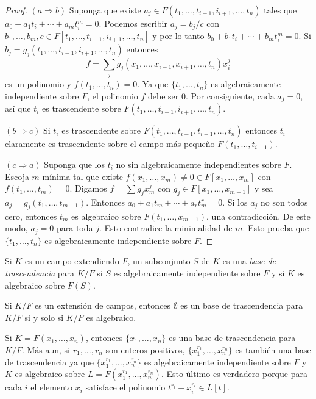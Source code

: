 \begin{proof}
  $(a \Rightarrow b)$ Suponga que existe $a_j\in F(t_1, \ldots, t_{i-1}, i_{i+1},\ldots, t_n)$ tales que $a_0 + a_1 t_i + \cdots + a_m t_i^{m} = 0$. Podemos escribir $a_j = b_j/c$ con $b_1, \ldots, b_m, c \in F[t_1, \ldots, t_{i-1}, i_{i+1},\ldots, t_n]$ y por lo tanto $b_0 + b_1 t_i + \cdots + b_m t_i^{m} = 0$. Si $b_j = g_j(t_1, \ldots, t_{i-1}, i_{i+1},\ldots, t_n)$ entonces
  \[
    f =  \sum_j g_j (x_1, \ldots, x_{i-1}, x_{i+1},\ldots, t_n) x_i^j 
  \]
  es un polinomio y $f(t_1,\ldots, t_n) =0$. Ya que $\{t_1, \ldots,t_n\}$ es algebraicamente independiente sobre $F$, el polinomio $f$ debe ser $0$. Por consiguiente, cada $a_j =0$, así que $t_i$ es trascendente sobre $F(t_1, \ldots, t_{i-1}, i_{i+1},\ldots, t_n)$.

  $(b \Rightarrow c)$ Si $t_i$ es trascendente sobre $F(t_1, \ldots, t_{i-1}, t_{i+1}, \ldots, t_n)$ entonces $t_i$ claramente es trascendente sobre el campo más pequeño $F(t_1, \ldots, t_{i-1})$.

  $(c \Rightarrow a)$ Suponga que los $t_i$ no sin algebraicamente independientes sobre $F$. Escoja $m$ mínima tal que existe $f(x_1, \ldots, x_m) \neq 0 \in F[x_1, \ldots, x_m]$ con $f(t_1, \ldots, t_m)  = 0$. Digamos $f = \sum g_j x_m^j$ con $g_j \in F[x_1, \ldots, x_{m-1}]$ y sea $a_j = g_j (t_1, \ldots, t_{m-1})$. Entonces $a_0 + a_1t_m + \cdots + a_r t_m^r =0$. Si los $a_j$ no son todos cero, entonces $t_m$ es algebraico sobre $F(t_1, \ldots, x_{m-1})$, una contradicción. De este modo, $a_j = 0$ para toda $j$. Esto contradice la minimalidad de $m$. Esto prueba que $\{t_1, \ldots, t_n\}$ es algebraicamente independiente sobre $F$.
\end{proof}


\begin{definition}
  Si $K$ es un campo extendiendo $F$, un subconjunto $S$ de $K$ es una \emph{base de trascendencia} para $K/F$ si $S$ es algebraicamente independiente sobre $F$ y si $K$ es algebraico sobre $F(S)$.
\end{definition}

\begin{example}
  Si $K/F$ es un extensión de campos, entonces $\emptyset$ es un base de trascendencia para $K/F$ si y solo si $K/F$ es algebraico.
\end{example}

\begin{example}
  Si $K = F(x_1, \ldots, x_n)$, entonces $\{x_1, \ldots, x_n\}$ es una base de trascendencia para $K/F$. Más aun, si $r_1, \ldots, r_n$ son enteros positivos, $\{x_1^{r_1}, \ldots, x_n^{r_n}\}$ es también una base de trascendencia ya que $\{x_1^{r_1}, \ldots, x_n^{r_n}\}$ es algebraicamente independiente sobre $F$ y $K$ es algebraico sobre $L = F(x_1^{r_1}, \ldots, x_n^{r_n})$. Esto último es verdadero porque para cada $i$ el elemento $x_i$ satisface el polinomio $t^{r_i} - x_i^{r_i} \in L[t]$.
\end{example}

